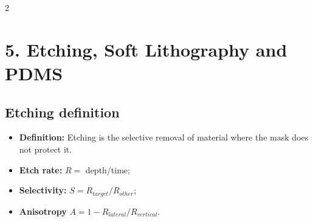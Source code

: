 \documentclass[10pt,a4paper]{ctexart}
\newcommand{\key}[1]{\textbf{#1}}
\begin{document}
\begin{multicols*}{2}
\section{5. Etching, Soft Lithography and PDMS}
\subsection{Etching definition}
\begin{itemize}
	\item \key{Definition:} Etching is the selective removal of material where the mask does not protect it.
	\item \key{Etch rate:} \(R=\) depth/time;
	\item \key{Selectivity:} \(S=R_{target}/R_{other}\);
	\item \key{Anisotropy} \(A=1-R_{lateral}/R_{vertical}\).
\end{itemize}


\end{multicols*}
\end{document}
